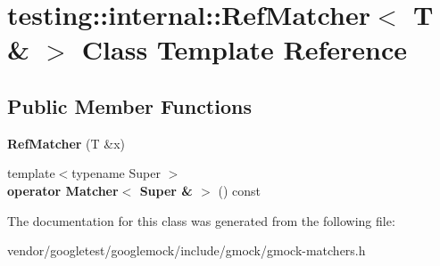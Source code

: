 \hypertarget{classtesting_1_1internal_1_1RefMatcher_3_01T_01_6_01_4}{}\section{testing\+:\+:internal\+:\+:Ref\+Matcher$<$ T \& $>$ Class Template Reference}
\label{classtesting_1_1internal_1_1RefMatcher_3_01T_01_6_01_4}
\subsection*{Public Member Functions}
\begin{DoxyCompactItemize}
\item 
{\bfseries Ref\+Matcher} (T \&x)\hypertarget{classtesting_1_1internal_1_1RefMatcher_3_01T_01_6_01_4_a94eaec01f11b3ed704092a62cdb9c21c}{}\label{classtesting_1_1internal_1_1RefMatcher_3_01T_01_6_01_4_a94eaec01f11b3ed704092a62cdb9c21c}

\item 
{\footnotesize template$<$typename Super $>$ }\\{\bfseries operator Matcher$<$ Super \& $>$} () const \hypertarget{classtesting_1_1internal_1_1RefMatcher_3_01T_01_6_01_4_ab9f16e34d127ef44dfb27c3e0f2aa163}{}\label{classtesting_1_1internal_1_1RefMatcher_3_01T_01_6_01_4_ab9f16e34d127ef44dfb27c3e0f2aa163}

\end{DoxyCompactItemize}


The documentation for this class was generated from the following file\+:\begin{DoxyCompactItemize}
\item 
vendor/googletest/googlemock/include/gmock/gmock-\/matchers.\+h\end{DoxyCompactItemize}
